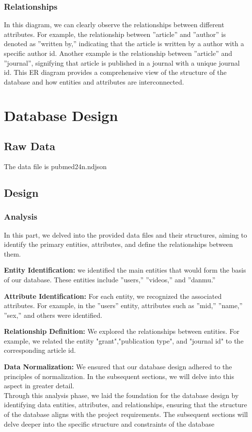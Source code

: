 \documentclass{article}
\begin{document}
\subsubsection{Relationships}
In this diagram, we can clearly observe the relationships between different attributes. For example, the relationship between ”article” and ”author”
is denoted as ”written by,” indicating that the article is written by a author with a specific author id. Another example is the relationship between ”article” and
”journal”, signifying that article is published in a journal with a unique journal id.
This ER diagram provides a comprehensive view of the structure of the
database and how entities and attributes are interconnected.



\section{Database Design}
\subsection{Raw Data}
The data file is pubmed24n.ndjson
\subsection{Design}
\subsubsection{Analysis}
In this part, we delved into the provided data files and their structures, aiming
to identify the primary entities, attributes, and define the relationships between
them.

\textbf{Entity Identification:}  we identified the main entities that would form the
basis of our database. These entities include ”users,” ”videos,” and ”danmu.”

\textbf{Attribute Identification:}  For each entity, we recognized the associated
attributes. For example, in the ”users” entity, attributes such as ”mid,” ”name,”
”sex,” and others were identified.

\textbf{Relationship Definition:}  We explored the relationships between entities.
For example, we related the entity "grant","publication type", and "journal id" to the corresponding article id.

\textbf{Data Normalization:}  We ensured that our database design adhered to the principles of normalization. In the subsequent sections, we will delve into
this aspect in greater detail.
\\ [1.3ex]
Through this analysis phase, we laid the foundation for the database design by identifying data entities, attributes, and relationships, ensuring that the
structure of the database aligns with the project requirements. The subsequent sections will delve deeper into the specific structure and constraints of the database
\end{document}
